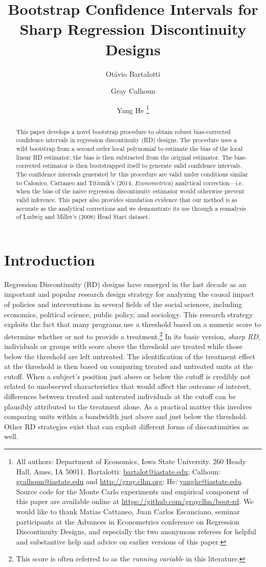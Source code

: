 \documentclass[12pt,fleqn]{article}
\title{Bootstrap Confidence Intervals for Sharp Regression Discontinuity Designs}
\author{Ot\'avio Bartalotti \and Gray Calhoun \and Yang He\DIFdelbegin %
\DIFdelend \DIFaddbegin \thanks{%
  All authors: Department of Economics, Iowa State University.
  260 Heady Hall, Ames, IA 50011.
  Bartalotti: \protect\url{bartalot@iastate.edu};
  Calhoun: \protect\url{gcalhoun@iastate.edu} and
  \protect\url{http://gray.clhn.org};
  He: \protect\url{yanghe@iastate.edu}. Source code for the Monte Carlo
  experiments and empirical component of this paper are available online
  at \protect\url{https://github.com/grayclhn/boot-rd}. We would like to
  thank Matias Cattaneo, Juan Carlos Escanciano, seminar participants at
  the Advances in Econometrics conference on Regression Discontinuity
  Designs, and especially the two anonymous referees for helpful and
  substantive help and advice on earlier versions of this paper.}\DIFaddend }
\begin{document}
\maketitle

\begin{abstract}\noindent
  This paper develops a novel bootstrap procedure to obtain robust
  bias-corrected confidence intervals in regression discontinuity (RD) designs. The procedure uses a wild bootstrap from a
  second order local polynomial to estimate the bias of the local linear RD
  estimator; the bias is then subtracted from the original estimator. The
  bias-corrected estimator is then bootstrapped itself to generate valid
  confidence intervals. The confidence intervals generated by this procedure
  are valid under conditions similar to Calonico, Cattaneo and Titiunik's
  (2014, \textit{Econometrica}) analytical correction---i.e.  when the bias of
  the naive regression discontinuity estimator would otherwise prevent valid
  inference. This paper also provides simulation evidence that our method is
  as accurate as the analytical corrections and we demonstrate its use through
  a reanalysis of Ludwig and Miller's (2008) Head Start dataset.
\end{abstract}

\section{Introduction}
Regression Discontinuity (RD) designs have emerged in the last decade as an
important and popular research design strategy for analyzing the causal impact
of policies and interventions in several fields of the social sciences,
including economics, political science, public policy, and sociology.  This
research strategy exploits the fact that many programs use a threshold based
on a numeric score to determine whether or not to provide a
treatment.\footnote{This score is often referred to as the \textit{running variable} in this
  literature.}
In its basic version, \textit{sharp RD}, individuals or groups with score
above the threshold are treated while those below the threshold are left
untreated. The identification of the treatment effect at the threshold is then
based on comparing treated and untreated units at the cutoff. When a subject's
position just above or below the cutoff is credibly not related to unobserved
characteristics that would affect the outcome of interest, differences between
treated and untreated individuals at the cutoff can be plausibly attributed to
the treatment alone. As a practical matter this involves comparing units
within a bandwidth just above and just below the threshold. Other RD
strategies exist that can exploit different forms of discontinuities as well.
\end{document}
